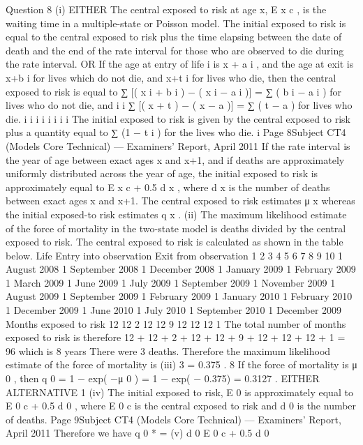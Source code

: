 \documentclass[a4paper,12pt]{article}
\begin{document}
\begin{enumerate}
Question 8
(i)
EITHER
The central exposed to risk at age x, E x c , is the waiting time in a multiple-state or
Poisson model.
The initial exposed to risk is equal to the central exposed to risk plus the time elapsing
between the date of death and the end of the rate interval for those who are observed
to die during the rate interval.
OR
If the age at entry of life i is x + a i , and the age at exit is x+b i for lives which do not
die, and x+t i for lives who die, then the central exposed to risk is equal to
∑ [( x i + b i ) − ( x i − a i )] = ∑ ( b i − a i ) for lives who do not die, and
i
i
∑ [( x + t ) − ( x − a )] = ∑ ( t − a ) for lives who die.
i
i
i
i
i
i
i
i
The initial exposed to risk is given by the central exposed to risk plus a quantity equal
to ∑ (1 − t i ) for the lives who die.
i
Page 8Subject CT4 (Models Core Technical) — Examiners’ Report, April 2011
If the rate interval is the year of age between exact ages x and x+1, and if deaths are
approximately uniformly distributed across the year of age, the initial exposed to risk
is approximately equal to E x c + 0.5 d x , where d x is the number of deaths between exact
ages x and x+1.
The central exposed to risk estimates μ x whereas the initial exposed-to risk estimates
q x .
(ii)
The maximum likelihood estimate of the force of mortality in the two-state model is
deaths divided by the central exposed to risk.
The central exposed to risk is calculated as shown in the table below.
Life Entry into
observation Exit from
observation
1
2
3
4
5
6
7
8
9
10 1 August 2008
1 September 2008
1 December 2008
1 January 2009
1 February 2009
1 March 2009
1 June 2009
1 July 2009
1 September 2009
1 November 2009 1 August 2009
1 September 2009
1 February 2009
1 January 2010
1 February 2010
1 December 2009
1 June 2010
1 July 2010
1 September 2010
1 December 2009
Months
exposed
to risk
12
12
2
12
12
9
12
12
12
1
The total number of months exposed to risk is therefore
12 + 12 + 2 + 12 + 12 + 9 + 12 + 12 + 12 + 1 = 96
which is 8 years
There were 3 deaths.
Therefore the maximum likelihood estimate of the force of mortality is
(iii)
3
= 0.375 .
8
If the force of mortality is μ 0 , then
q 0 = 1 − exp( −μ 0 ) = 1 − exp( − 0.375) = 0.3127 .
EITHER ALTERNATIVE 1
(iv)
The initial exposed to risk, E 0 is approximately equal to E 0 c + 0.5 d 0 , where E 0 c is the
central exposed to risk and d 0 is the number of deaths.
Page 9Subject CT4 (Models Core Technical) — Examiners’ Report, April 2011
Therefore we have
q 0 * =
(v)
d 0
E 0 c
+ 0.5 d 0

\end{enumerate}
\end{document}
